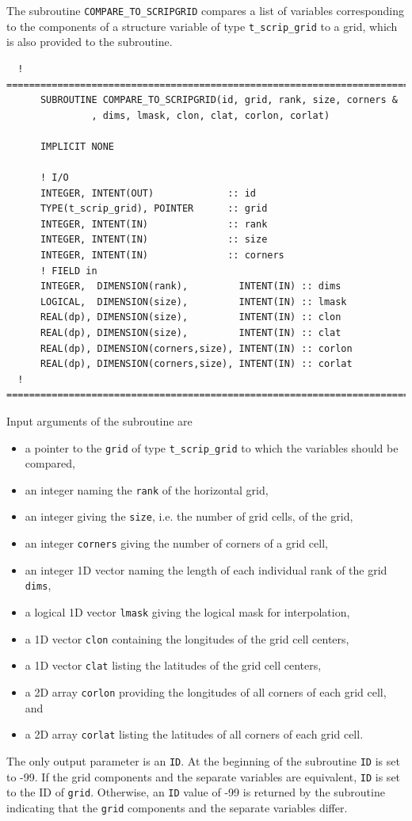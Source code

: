 \documentclass[11pt,twoside]{article}
\begin{document}
The subroutine \verb|COMPARE_TO_SCRIPGRID| compares a list of variables
corresponding to the components of a structure variable of
type \verb|t_scrip_grid| to a grid, which is also provided to the subroutine.
\begin{verbatim}
  ! ================================================================================
      SUBROUTINE COMPARE_TO_SCRIPGRID(id, grid, rank, size, corners &
               , dims, lmask, clon, clat, corlon, corlat)

      IMPLICIT NONE

      ! I/O
      INTEGER, INTENT(OUT)             :: id
      TYPE(t_scrip_grid), POINTER      :: grid
      INTEGER, INTENT(IN)              :: rank
      INTEGER, INTENT(IN)              :: size
      INTEGER, INTENT(IN)              :: corners
      ! FIELD in
      INTEGER,  DIMENSION(rank),         INTENT(IN) :: dims
      LOGICAL,  DIMENSION(size),         INTENT(IN) :: lmask
      REAL(dp), DIMENSION(size),         INTENT(IN) :: clon
      REAL(dp), DIMENSION(size),         INTENT(IN) :: clat
      REAL(dp), DIMENSION(corners,size), INTENT(IN) :: corlon
      REAL(dp), DIMENSION(corners,size), INTENT(IN) :: corlat
  ! ================================================================================
\end{verbatim}
Input arguments of the subroutine are 
\begin{itemize}
\item a pointer to the \verb|grid| of
type \verb|t_scrip_grid| to which the variables should be compared, 
\item an integer naming the \verb|rank| of the horizontal grid,
\item an integer giving the \verb|size|, i.e. the number of grid
cells, of the grid,
\item an integer \verb|corners| giving the number of corners of a grid cell,
\item an integer 1D vector naming the length of each
individual rank of the grid \verb|dims|,
\item a logical 1D vector \verb|lmask| giving the logical mask for
interpolation, 
\item a 1D vector \verb|clon| containing the longitudes of the grid
cell centers, 
\item a 1D vector \verb|clat| listing the latitudes of the grid
cell centers, 
\item a 2D array \verb|corlon| providing the longitudes of all corners
of each grid cell, and 
\item a 2D array \verb|corlat| listing the latitudes of all corners
of each grid cell.
\end{itemize}
The only output parameter is an \verb|ID|. At the beginning of the
subroutine \verb|ID| is set to -99. If the grid components and the
separate variables are equivalent, \verb|ID| is set to the ID of \verb|grid|.
Otherwise, an \verb|ID| value of -99 is returned by the subroutine
indicating that the \verb|grid| components and the separate variables differ.
\end{document}
